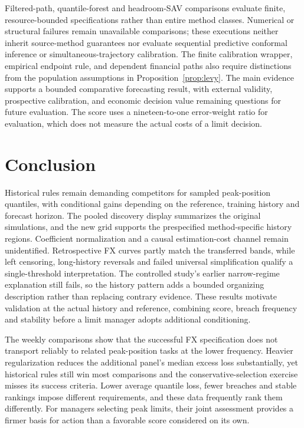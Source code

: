\documentclass[11pt,a4paper]{article}
\begin{document}
Filtered-path, quantile-forest and headroom-SAV comparisons evaluate finite, resource-bounded specifications rather than entire method classes. Numerical or structural failures remain unavailable comparisons; these executions neither inherit source-method guarantees nor evaluate sequential predictive conformal inference or simultaneous-trajectory calibration. The finite calibration wrapper, empirical endpoint rule, and dependent financial paths also require distinctions from the population assumptions in Proposition~\ref{prop:levy}. The main evidence supports a bounded comparative forecasting result, with external validity, prospective calibration, and economic decision value remaining questions for future evaluation. The score uses a nineteen-to-one error-weight ratio for evaluation, which does not measure the actual costs of a limit decision.


\FloatBarrier

\section{Conclusion}\label{sec:conclusion}

Historical rules remain demanding competitors for sampled peak-position quantiles, with conditional gains depending on the reference, training history and forecast horizon. The pooled discovery display summarizes the original simulations, and the new grid supports the prespecified method-specific history regions. Coefficient normalization and a causal estimation-cost channel remain unidentified. Retrospective FX curves partly match the transferred bands, while left censoring, long-history reversals and failed universal simplification qualify a single-threshold interpretation. The controlled study's earlier narrow-regime explanation still fails, so the history pattern adds a bounded organizing description rather than replacing contrary evidence. These results motivate validation at the actual history and reference, combining score, breach frequency and stability before a limit manager adopts additional conditioning.


The weekly comparisons show that the successful FX specification does not transport reliably to related peak-position tasks at the lower frequency. Heavier regularization reduces the additional panel's median excess loss substantially, yet historical rules still win most comparisons and the conservative-selection exercise misses its success criteria. Lower average quantile loss, fewer breaches and stable rankings impose different requirements, and these data frequently rank them differently. For managers selecting peak limits, their joint assessment provides a firmer basis for action than a favorable score considered on its own.
\end{document}
